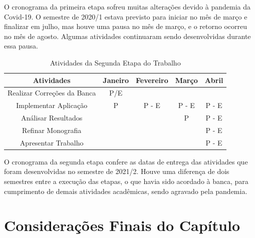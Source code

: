 O cronograma da primeira etapa sofreu muitas alterações devido à pandemia da Covid-19. O semestre de 2020/1 estava previsto para iniciar no mês de março e finalizar em julho, mas houve uma pausa no 
mês de março, e o retorno ocorreu no mês de agosto. Algumas atividades continuaram sendo desenvolvidas durante essa pausa.



\begin{table}[ht]
	\centering
	\caption{Atividades da Segunda Etapa do Trabalho}
	\label{tab05}
	
	\begin{tabular}{ccccc}
		\toprule
		\textbf{Atividades} & \textbf{Janeiro} & 
		\textbf{Fevereiro}  & \textbf{Março}& \textbf{Abril}\\
		\midrule
		\begin{minipage} [t] {0.2\textwidth} \centering Realizar Correções da Banca \end{minipage} & P/E &  &  &  \\
		\midrule
		\begin{minipage} [t] {0.2\textwidth} \centering Implementar Aplicação \end{minipage} & P & P - E & P - E & P - E  \\
		\midrule
		\begin{minipage} [t] {0.2\textwidth} \centering Análisar Resultados \end{minipage} &  &  &P &P - E  \\
		\midrule
		\begin{minipage} [t] {0.2\textwidth} \centering Refinar Monografia \end{minipage} &  &  &  & P - E \\
		\midrule
		\begin{minipage} [t] {0.2\textwidth} \centering Apresentar Trabalho \end{minipage} &  & & & P - E \\
		\bottomrule
	\end{tabular}
\end{table}

O cronograma da segunda etapa confere as datas de entrega das atividades 
que foram desenvolvidas no semestre de 2021/2. Houve uma diferença de dois semestres entre a execução das etapas, 
o que havia sido acordado à banca, para cumprimento de demais atividades acadêmicas, sendo agravado pela pandemia.

\section{Considerações Finais do Capítulo}

